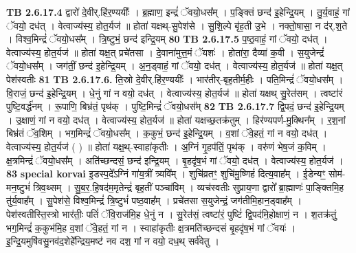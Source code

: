 \documentclass[17pt]{extarticle}
\begin{document}
                  \newline
                                \textbf{ TB 2.6.17.4} \newline
                  द्वारो॑ दे॒वीर्.हि॑र॒ण्ययीः᳚ । ब्र॒ह्माण॒ इन्द्रं॑ ॅवयो॒धस᳚म् । प॒ङ्क्तिं छन्द॑ इ॒हेन्द्रि॒यम् । तु॒र्य॒वाहं॒ गां ॅवयो॒ दध॑त् । वेत्वाज्य॑स्य॒ होत॒र्यज॑ ॥ होता॑ यक्षथ्-सु॒पेश॑से । सु॒शि॒ल्पे बृ॑ह॒ती उ॒भे । नक्तो॒षासा॒ न द॑र्.श॒ते । विश्व॒मिन्द्रं॑ ॅवयो॒धस᳚म् । त्रि॒ष्टुभं॒ छन्द॑ इन्द्रि॒यम् \textbf{ 80} \newline
                  \newline
                                \textbf{ TB 2.6.17.5} \newline
                  प॒ष्ठ॒वाहं॒ गां ॅवयो॒ दध॑त् । वेत्वाज्य॑स्य॒ होत॒र्यज॑ ॥ होता॑ यक्ष॒त् प्रचे॑तसा । दे॒वाना॑मुत्त॒मं ॅयशः॑ । होता॑रा॒ दैव्या॑ क॒वी । स॒युजेन्द्रं॑ ॅवयो॒धस᳚म् । जग॑तीं॒ छन्द॑ इ॒हेन्द्रि॒यम् । अ॒न॒ड्वाहं॒ गां ॅवयो॒ दध॑त् । वेत्वाज्य॑स्य॒ होत॒र्यज॑ ॥ होता॑ यक्ष॒त् पेश॑स्वतीः \textbf{ 81} \newline
                  \newline
                                \textbf{ TB 2.6.17.6.} \newline
                  ति॒स्रो दे॒वीर्.हि॑र॒ण्ययीः᳚ । भार॑तीर्-बृह॒तीर्म॒हीः । पति॒मिन्द्रं॑ ॅवयो॒धस᳚म् । वि॒राजं॒ छन्द॑ इ॒हेन्द्रि॒यम् । धे॒नुं गां न वयो॒ दध॑त् । वेत्वाज्य॑स्य॒ होत॒र्यज॑ ॥ होता॑ यक्षथ् सु॒रेत॑सम् । त्वष्टा॑रं पुष्टि॒वर्द्ध॑नम् । रू॒पाणि॒ बिभ्र॑तं॒ पृथ॑क् । पुष्टि॒मिन्द्रं॑ ॅवयो॒धस᳚म् \textbf{ 82} \newline
                  \newline
                                \textbf{ TB 2.6.17.7} \newline
                  द्वि॒पदं॒ छन्द॑ इ॒हेन्द्रि॒यम् । उ॒क्षाणं॒ गां न वयो॒ दध॑त् । वेत्वाज्य॑स्य॒ होत॒र्यज॑ ॥ होता॑ यक्षच्छ॒तक्र॑तुम् । हिर॑ण्यपर्ण-मु॒क्थिन᳚म् । र॒श॒नां बिभ्र॑तं ॅव॒शिम् । भग॒मिन्द्रं॑ ॅवयो॒धस᳚म् । क॒कुभं॒ छन्द॑ इ॒हेन्द्रि॒यम् । व॒शां ॅवे॒हतं॒ गां न वयो॒ दध॑त् । वेत्वाज्य॑स्य॒ होत॒र्यज॑ ( ) ॥ होता॑ यक्ष॒थ्-स्वाहा॑कृतीः । अ॒ग्निं गृ॒हप॑तिं॒ पृथ॑क् । वरु॑णं भेष॒जं क॒विम् । क्ष॒त्रमिन्द्रं॑ ॅवयो॒धस᳚म् । अति॑च्छन्दसं॒ छन्द॑ इन्द्रि॒यम् । बृ॒हदृ॑ष॒भं गां ॅवयो॒ दध॑त् । वेत्वाज्य॑स्य॒ होत॒र्यज॑ । \textbf{ 83} \newline
                  \newline
                                                        \textbf{special korvai} \newline
              इ॒डस्प॒दे᳚ऽग्निं गा॑य॒त्रीं त्र्यवि᳚म् । शुचि॑व्रतꣳ॒॒ शुचि॑मु॒ष्णिहं॑ दित्य॒वाह᳚म् । ई॒डेन्यꣳ॒॒ सोम॑-मन॒ष्टुभं॑ त्रिव॒थ्सम् । सु॒ब॒र॒.हि॒षद॑म॒मृतेन्द्रं॑ बृह॒तीं पञ्चा॑विम् । व्यच॑स्वतीः सुप्राय॒णा द्वारो᳚ ब्रा॒ह्माणः॑ पा॒ङ्क्तिमि॒ह तु॑र्य॒वाह᳚म् । सु॒पेश॑से॒ विश्व॒मिन्द्रं॑ त्रि॒ष्टुभं॑ पष्ठ॒वाह᳚म् । प्रचे॑तसा स॒युजेन्द्रं॒ जग॑तीमि॒हान॒ड्वाह᳚म् । पेश॑स्वतीस्ति॒स्त्रो भार॑तीः॒ पतिं॑ ॅवि॒राज॑मि॒ह धे॒नुं न । सु॒रेत॑सं॒ त्वष्टा॑रं॒ पुष्टिं॑ द्वि॒पद॑मि॒होक्षाणं॒ न । श॒तक्र॑तुं॒ भग॒मिन्द्रं॑ क॒कुभ॑मि॒ह व॒शां ॅवे॒हतं॒ गां न । स्वाहा॑कृतीः क्ष॒त्रमति॑च्छन्दसं बृ॒हदृ॑ष॒भं गां ॅवयः॑ । इ॒न्द्रि॒यमुषि॑वसु॒नव॑द॒शेहे᳚न्द्रिय॒मष्ट॑ नव दश॒ गां न वयो॒ दध॒थ् सर्व॑वेतु । \newline
\end{document}
